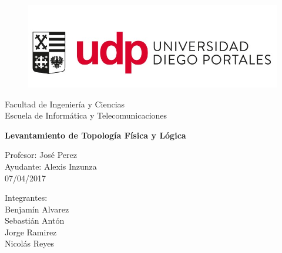\documentclass[onecolumn,11pts]{IEEEtran}
\date{November 2016}
\begin{document}
\begin{titlepage}

\begin{center}
\vspace*{-1in}
\begin{figure}[htb]
\begin{center}
\includegraphics[scale=0.4]{UDP}
\end{center}
\end{figure}
Facultad de Ingeniería y Ciencias\\Escuela de Informática y Telecomunicaciones\\
\vspace*{0.15in}
\vspace*{1in}

\begin{LARGE}
\textbf{Levantamiento de Topología Física y Lógica} \\
\end{LARGE}
\vspace*{1in}
\begin{large}
Profesor: José Perez\\Ayudante: Alexis Inzunza\\07/04/2017
\end{large}
\vspace*{0.3in}
\vspace*{1in}
\begin{large}
\begin{flushright}

Integrantes: \\
Benjamín Alvarez \\ Sebastián Antón \\ Jorge Ramirez \\ Nicolás Reyes\\
\end{flushright}
\end{large}
\end{center}
\end{titlepage}


\tableofcontents %
\end{document}

